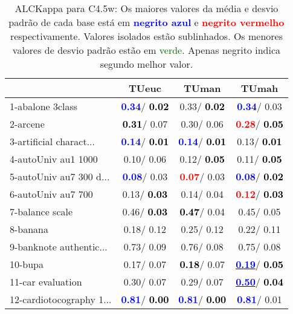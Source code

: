\begin{table}[h]
\caption{ALCKappa para C4.5w: Os maiores valores da média e desvio padrão de cada base está em \textcolor{blue}{\textbf{negrito azul}} e \textcolor{red}{\textbf{negrito vermelho}} respectivamente. Valores isolados estão sublinhados. Os menores valores de desvio padrão estão em \textcolor{darkgreen}{verde}. Apenas negrito indica segundo melhor valor.}
\begin{center}\begin{tabular}{lc|c|c}
 & TUeuc & TUman & TUmah\\ \hline 1-abalone 3class & \textcolor{blue}{\textbf{  0.34}}/\textcolor{black}{\textbf{  0.02}} &   0.33/\textcolor{black}{\textbf{  0.02}} & \textcolor{blue}{\textbf{  0.34}}/  0.03 \\
2-arcene & \textcolor{black}{\textbf{  0.31}}/  0.07 &   0.30/  0.06 & \textcolor{red}{\textbf{  0.28}}/\textcolor{black}{\textbf{  0.05}} \\
3-artificial charact... & \textcolor{blue}{\textbf{  0.14}}/\textcolor{black}{\textbf{  0.01}} & \textcolor{blue}{\textbf{  0.14}}/\textcolor{black}{\textbf{  0.01}} &   0.13/\textcolor{black}{\textbf{  0.01}} \\
4-autoUniv au1 1000 &   0.10/  0.06 &   0.12/\textcolor{black}{\textbf{  0.05}} &   0.11/\textcolor{black}{\textbf{  0.05}} \\
5-autoUniv au7 300 d... & \textcolor{blue}{\textbf{  0.08}}/  0.03 & \textcolor{red}{\textbf{  0.07}}/  0.03 & \textcolor{blue}{\textbf{  0.08}}/\textcolor{black}{\textbf{  0.02}} \\
6-autoUniv au7 700 &   0.13/\textcolor{black}{\textbf{  0.03}} &   0.14/  0.04 & \textcolor{red}{\textbf{  0.12}}/\textcolor{black}{\textbf{  0.03}} \\
7-balance scale &   0.46/\textcolor{black}{\textbf{  0.03}} & \textcolor{black}{\textbf{  0.47}}/  0.04 &   0.45/  0.05 \\ \hline
8-banana &   0.18/  0.12 &   0.25/  0.12 &   0.22/  0.11 \\
9-banknote authentic... &   0.73/  0.09 &   0.76/  0.08 &   0.75/  0.08 \\
10-bupa &   0.17/  0.07 & \textcolor{black}{\textbf{  0.18}}/  0.07 & \underline{\textcolor{blue}{\textbf{  0.19}}}/\textcolor{black}{\textbf{  0.05}} \\
11-car evaluation &   0.30/  0.07 &   0.29/  0.07 & \underline{\textcolor{blue}{\textbf{  0.50}}}/\textcolor{black}{\textbf{  0.04}} \\
12-cardiotocography 1... & \textcolor{blue}{\textbf{  0.81}}/\textcolor{black}{\textbf{  0.00}} & \textcolor{blue}{\textbf{  0.81}}/\textcolor{black}{\textbf{  0.00}} & \textcolor{blue}{\textbf{  0.81}}/  0.01 \\

\end{tabular}
\end{center}
\end{table}

